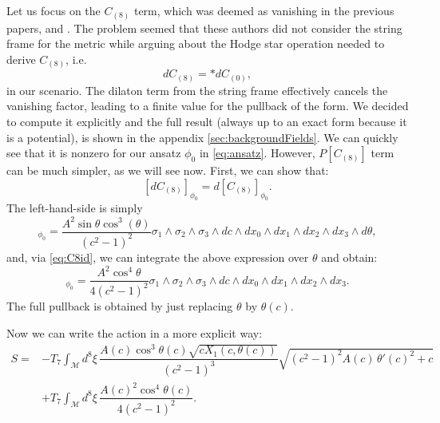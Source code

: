 Let us focus on the $C_{(8)}$ term, which was deemed as vanishing in the previous papers, \cite{Albash:2011nw} and \cite{Evans:2005ti}. The problem seemed that these authors did not consider the string frame for the metric while arguing about the Hodge star operation needed to derive $C_{(8)}$, i.e.
\begin{equation}
 dC_{(8)} = \ast dC_{(0)},
\end{equation}
in our scenario. The dilaton term from the string frame effectively cancels the vanishing factor, leading to a finite value for the pullback of the form. We decided to compute it explicitly and the full result (always up to an exact form because it is a potential), is shown in the appendix \ref{sec:backgroundFields}. We can quickly see that it is nonzero for our ansatz $\phi_0$ in \eqref{eq:ansatz}. However, $P[C_{(8)}]$ term can be much simpler, as we will see now. First, we can show that:
\begin{equation}\label{eq:C8id}
 [d C_{(8)}]_{\phi_0} = d [C_{(8)}]_{\phi_0}.
\end{equation}
The left-hand-side is simply
\begin{equation}
 [d C_{(8)}]_{\phi_0}  = \dfrac{A^2 \sin\theta \cos^3(\theta)}{\left(c^2-1\right)^2} 
\sigma_1 \wedge \sigma_2 \wedge \sigma_3 \wedge dc  \wedge dx_0 \wedge dx_1 \wedge dx_2 \wedge dx_3 \wedge d\theta,
\end{equation}
and, via \eqref{eq:C8id}, we can integrate the above expression over $\theta$ and obtain:
\begin{equation}
[C_{(8)}]_{\phi_0} = \dfrac{A^2 \cos^4\theta}{4 \left(c^2-1\right)^2} \sigma_1 \wedge \sigma_2 \wedge \sigma_3 \wedge dc \wedge dx_0 \wedge dx_1 \wedge dx_2 \wedge dx_3.
\end{equation}
The full pullback is obtained by just replacing $\theta$ by $\theta(c)$.


Now we can write the action in a more explicit way:
\begin{align}\label{eq:ActionWithTheta'}
 S = & -T_7 \int_\mathcal{M} d^8\xi \, \dfrac{A(c) \cos^3\theta (c) \sqrt{c X_1(c, \theta(c))}}{\left(c^2-1\right)^3} \sqrt{\left(c^2-1\right)^2 A(c) \, \theta '(c)^2+c} \nonumber \\
     & +T_7\int _\mathcal{M} d^8\xi \, \dfrac{A(c)^2 \cos^4\theta(c)}{4 \left(c^2-1\right)^2}.
\end{align}



